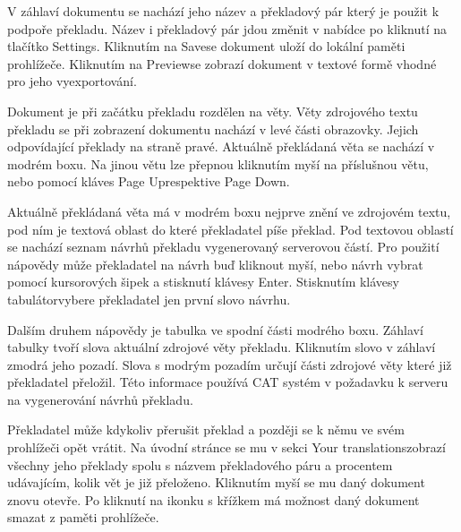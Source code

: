 \documentclass[12pt,a4paper]{report}
\let\openright=\clearpage
\begin{document}
V záhlaví dokumentu se nachází jeho název a překladový pár který je použit k podpoře překladu. Název i překladový pár jdou změnit v nabídce po kliknutí na tlačítko \clqq Settings\crqq . Kliknutím na \clqq Save\crqq  se dokument uloží do lokální paměti prohlížeče. Kliknutím na \clqq Preview\crqq  se zobrazí dokument v textové formě vhodné pro jeho vyexportování.

Dokument je při začátku překladu rozdělen na věty. Věty zdrojového textu překladu se při zobrazení dokumentu nachází v levé části obrazovky. Jejich odpovídající překlady na straně pravé. Aktuálně překládaná věta se nachází v modrém boxu. Na jinou větu lze přepnou kliknutím myší na příslušnou větu, nebo pomocí kláves \clqq Page Up\crqq  respektive \clqq Page Down\crqq .

Aktuálně překládaná věta má v modrém boxu nejprve znění ve zdrojovém textu, pod ním je textová oblast do které překladatel píše překlad. Pod textovou oblastí se nachází seznam návrhů překladu vygenerovaný serverovou částí. Pro použití nápovědy může překladatel na návrh buď kliknout myší, nebo návrh vybrat pomocí kursorových šipek a stisknutí klávesy \clqq Enter\crqq . Stisknutím klávesy \clqq tabulátor\crqq  vybere překladatel jen první slovo návrhu.

Dalším druhem nápovědy je tabulka ve spodní části modrého boxu. Záhlaví tabulky tvoří slova aktuální zdrojové věty překladu. Kliknutím slovo v záhlaví zmodrá jeho pozadí. Slova s modrým pozadím určují části zdrojové věty které již překladatel přeložil. Této informace používá CAT systém v požadavku k serveru na vygenerování návrhů překladu.

Překladatel může kdykoliv přerušit překlad a později se k němu ve svém prohlížeči opět vrátit. Na úvodní stránce se mu v sekci \clqq Your translations\crqq  zobrazí všechny jeho překlady spolu s názvem překladového páru a procentem udávajícím, kolik vět je již přeloženo. Kliknutím myší se mu daný dokument znovu otevře. Po kliknutí na ikonku s křížkem má možnost daný dokument smazat z paměti prohlížeče.


% 



%

\openright

\def\bibname{Seznam použité literatury}


\end{document}
